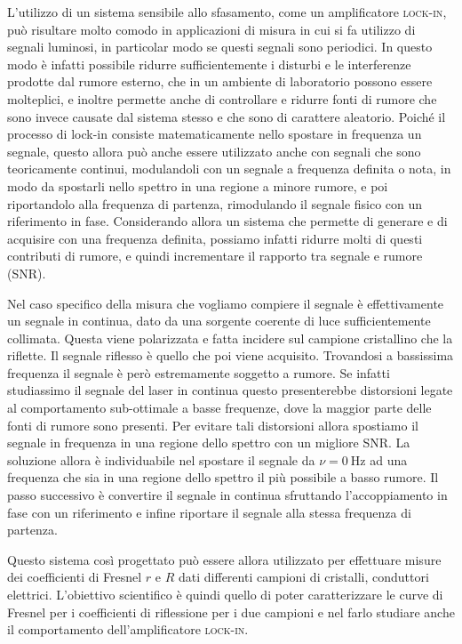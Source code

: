 \documentclass[
    prb,altaffilletter,citeautoscript,
    amsmath,amssymb,
    showpacs,showkeys,floatfix,
    reprint
]{revtex4-1}
\begin{document}
L'utilizzo di un sistema sensibile allo sfasamento, come un amplificatore \textsc{lock-in}, può risultare molto comodo in applicazioni di misura in cui si fa utilizzo di segnali luminosi, in particolar modo se questi segnali sono periodici. In questo modo è infatti possibile ridurre sufficientemente i disturbi e le interferenze prodotte dal rumore esterno, che in un ambiente di laboratorio possono essere molteplici, e inoltre permette anche di controllare e ridurre fonti di rumore che sono invece causate dal sistema stesso e che sono di carattere aleatorio. Poiché il processo di lock-in consiste matematicamente nello spostare in frequenza un segnale, questo allora può anche essere utilizzato anche con segnali che sono teoricamente continui, modulandoli con un segnale a frequenza definita o nota, in modo da spostarli nello spettro in una regione a minore rumore, e poi riportandolo alla frequenza di partenza, rimodulando il segnale fisico con un riferimento in fase. Considerando allora un sistema che permette di generare e di acquisire con una frequenza definita, possiamo infatti ridurre molti di questi contributi di rumore, e quindi incrementare il rapporto tra segnale e rumore (SNR). 

Nel caso specifico della misura che vogliamo compiere il segnale è effettivamente un segnale in continua, dato da una sorgente coerente di luce sufficientemente collimata. Questa viene polarizzata e fatta incidere sul campione cristallino che la riflette. Il segnale riflesso è quello che poi viene acquisito. Trovandosi a bassissima frequenza il segnale è però estremamente soggetto a rumore. Se infatti studiassimo il segnale del laser in continua questo presenterebbe distorsioni legate al comportamento sub-ottimale a basse frequenze, dove la maggior parte delle fonti di rumore sono presenti. Per evitare tali distorsioni allora spostiamo il segnale in frequenza in una regione dello spettro con un migliore SNR. La soluzione allora è individuabile nel spostare il segnale da $\nu=\SI{0}{\Hz}$ ad una frequenza che sia in una regione dello spettro il più possibile a basso rumore. Il passo successivo è convertire il segnale in continua sfruttando l'accoppiamento in fase con un riferimento e infine riportare il segnale alla stessa frequenza di partenza. 

Questo sistema così progettato può essere allora utilizzato per effettuare misure dei coefficienti di Fresnel\cite{fresnelCalculationTintsThat2021,fresnelNoteCalculTeintes1821} $r$ e $R$ dati differenti campioni di cristalli, conduttori elettrici. L'obiettivo scientifico è quindi quello di poter caratterizzare le curve di Fresnel per i coefficienti di riflessione per i due campioni e nel farlo studiare anche il comportamento dell'amplificatore \textsc{lock-in}. 
\end{document}
